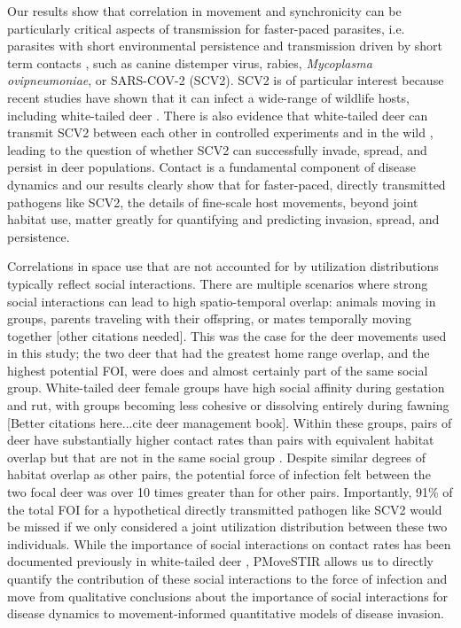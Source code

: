 \documentclass[letterpaper]{article}
\begin{document}

Our results show that correlation in movement and synchronicity can be particularly critical aspects of transmission for faster-paced parasites, i.e. parasites with short environmental persistence and transmission driven by short term contacts \citep[cf.][]{Dougherty2018,Manlove2022}, such as canine distemper virus, rabies, \emph{Mycoplasma ovipneumoniae}, or SARS-COV-2 (SCV2). SCV2 is of particular interest because recent studies have shown that it can infect a wide-range of wildlife hosts, including white-tailed deer \citep{Palmer2021,Hale2022}. There is also evidence that white-tailed deer can transmit SCV2 between each other in controlled experiments and in the wild \citep{Martins2022,Hale2022}, leading to the question of whether SCV2 can successfully invade, spread, and persist in deer populations. 
Contact is a fundamental component of disease dynamics and our results clearly show that for faster-paced, directly transmitted pathogens like SCV2, the details of fine-scale host movements, beyond joint habitat use, matter greatly for quantifying and predicting invasion, spread, and persistence. 

Correlations in space use that are not accounted for by utilization distributions typically reflect social interactions.  There are multiple scenarios where strong social interactions can lead to high spatio-temporal overlap: animals moving in groups, parents traveling with their offspring, or mates temporally moving together \citep{Yang2021} [other citations needed]. This was the case for the deer movements used in this study; the two deer that had the greatest home range overlap, and the highest potential FOI, were does and almost certainly part of the same social group. White-tailed deer female groups have high social affinity during gestation and rut, with groups becoming less cohesive or dissolving entirely during fawning \citep{Koen2017} [Better citations here...cite deer management book].  Within these groups, pairs of deer have substantially higher contact rates than pairs with equivalent habitat overlap but that are not in the same social group \citep{Schauber2007a,Kjaer2008,Schauber2015a,Grear2010}. Despite similar degrees of habitat overlap as other pairs, the potential force of infection felt between the two focal deer was over 10 times greater than for other pairs. Importantly, 91\% of the total FOI for a hypothetical directly transmitted pathogen like SCV2 would be missed if we only considered a joint utilization distribution between these two individuals.  While the importance of social interactions on contact rates has been documented previously in white-tailed deer \citep{Grear2010,Schauber2015a}, PMoveSTIR allows us to directly quantify the contribution of these social interactions to the force of infection and move from qualitative conclusions about the importance of social interactions for disease dynamics to movement-informed quantitative models of disease invasion.
\end{document}
